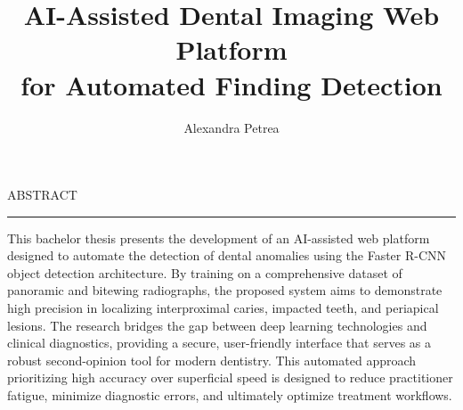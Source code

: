 \documentclass[12pt]{report}
\begin{document}
\title{AI-Assisted Dental Imaging Web Platform \\ \large for Automated Finding Detection}					   
\author{Alexandra Petrea}											
				
\maketitle

\newpage
\thispagestyle{empty}
\mbox{}
\newpage
{} 

\cleardoublepage
ABSTRACT
\vspace{0.5cm}	
\hrule
\vspace{0.5cm}	

This bachelor thesis presents the development of an AI-assisted web platform designed to automate the detection of dental anomalies using the Faster R-CNN object detection architecture. By training on a comprehensive dataset of panoramic and bitewing radiographs, the proposed system aims to demonstrate high precision in localizing interproximal caries, impacted teeth, and periapical lesions. The research bridges the gap between deep learning technologies and clinical diagnostics, providing a secure, user-friendly interface that serves as a robust second-opinion tool for modern dentistry. This automated approach prioritizing high accuracy over superficial speed is designed to reduce practitioner fatigue, minimize diagnostic errors, and ultimately optimize treatment workflows.

\tableofcontents

\newpage
{}



%


%



\end{document}
